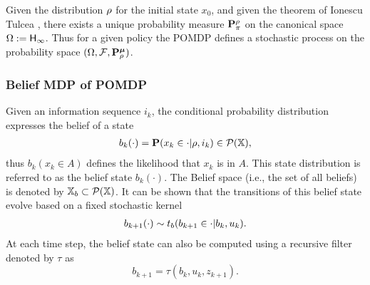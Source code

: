 \documentclass{ifacconf}
\newcommand{\red}[1]{{\color{red} #1}}
\begin{document}
 Given the distribution $\rho$ for the initial state $x_0$,  and given the theorem of Ionescu Tulcea \citep{hll1996}, there exists a unique probability measure $\mathbf{P}_\pi^\rho$ on the canonical space $\Omega:={\mathsf{H}}_\infty$. Thus for a given policy the POMDP defines a stochastic process on the probability space  
 $(\Omega,\mathcal F,\mathbf{P}_\rho^{\boldsymbol{\mu}})$.
%
%

 \subsubsection{Belief MDP of POMDP}
 Given an information sequence $i_k$,  the conditional probability distribution expresses the belief of a state 
\begin{align}
	b_k(\cdot)=\mathbf{P}(x_k\in \cdot|\rho,i_k)\in \mathcal P ({\mathbb{X}}),
\end{align}
thus $	b_k(x_k\in A) $ defines the likelihood that $x_k$ is in $A$.  %
This state distribution is referred to as the belief state $b_k(\cdot)$. 
The Belief space (i.e., the set of all beliefs) is denoted by ${{\mathbb{X}}_b}\subset \mathcal P({\mathbb{X}})$.
It can be shown that the transitions of this belief state evolve based on a fixed stochastic kernel
\begin{align}\label{eq:trb}
	 b_{k+1}(\cdot)\sim t_b(b_{k+1}\in \cdot|b_k,u_k).
\end{align}
At each time step, the belief state can also be computed using a 
recursive filter denoted by $\tau$ as 
\[b_{k+1}=\tau(b_k,u_k,z_{k+1}).\]
\end{document}
